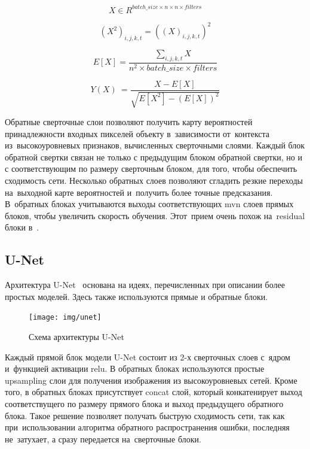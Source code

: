 \begin{equation}
\label{eq:mvn_input_batch}
X\in{}R^{batch\_size\times{}n\times{}n\times{}filters}
\end{equation}

\begin{equation}
\label{eq:mvn_squared_batch}
(X^{2})_{i,j,k,t}=((X)_{i,j,k,t})^{2}
\end{equation}

\begin{equation}
\label{eq:mvn_expected_value}
E[X]=\frac{
  \sum_{i,j,k,t}X
}{
  n^{2}\times{}batch\_size\times{}filters
}
\end{equation} 

\begin{equation}
\label{eq:mvn}
Y(X)\ = \frac{
  X - E[X]
}{\sqrt{
  E[X^{2}] - (E[X])^2
}}
\end{equation}

Обратные сверточные слои 
позволяют получить карту вероятностей принадлежности 
входных пикселей объекту в~зависимости от~контекста 
из~высокоуровневых признаков, вычисленных сверточными слоями. 
Каждый блок обратной свертки связан не только с предыдущим блоком 
обратной свертки, но и с соответствующим по размеру сверточным блоком, 
для того, чтобы обеспечить сходимость сети. Несколько обратных слоев 
позволяют сгладить резкие переходы на~выходной карте вероятностей 
и~получить более точные предсказания. В~обратных блоках учитываются 
выходы соответствующих mvn слоев прямых блоков, чтобы увеличить 
скорость обучения. Этот~прием очень похож на~residual блоки в~\cite{resnet}.

\subsection{U-Net}

Архитектура U-Net~\cite{unet} основана на идеях, 
перечисленных при описании более простых моделей. 
Здесь также используются прямые и обратные блоки. 

\begin{figure}[hb]
  \texttt{[image: img/unet]}
  \caption{Схема архитектуры U-Net}
\end{figure}

Каждый прямой блок модели U-Net состоит из 2-х сверточных слоев 
с~ядром  и~функцией активации relu. В обратных блоках используются 
простые upsampling слои для получения изображения из высокоуровневых сетей. 
Кроме того, в обратных блоках присутствует concat слой, который конкатенирует 
выход соответствущего по размеру прямого блока и выход предыдущего обратного 
блока. Такое решение позволяет получать быструю сходимость сети, так как 
при~использовании алгоритма обратного распространения ошибки, последняя 
не~затухает, а сразу передается на~сверточные блоки. 

